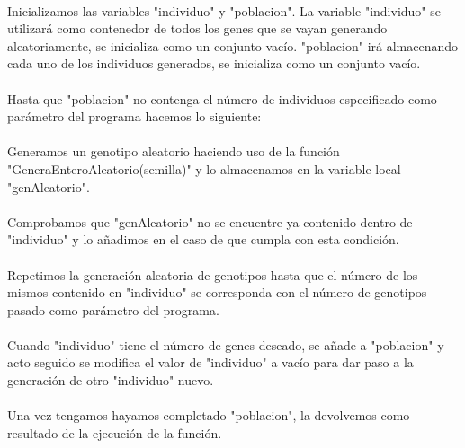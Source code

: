 	\paragraph{}Inicializamos las variables "individuo" y "poblacion". La variable "individuo" se utilizará como contenedor de todos los genes que se vayan generando aleatoriamente, se inicializa como un conjunto vacío. "poblacion" irá almacenando cada uno de los individuos generados, se inicializa como un conjunto vacío.
	
	\paragraph{}Hasta que "poblacion" no contenga el número de individuos especificado como parámetro del programa hacemos lo siguiente:
	
	\paragraph{}Generamos un genotipo aleatorio haciendo uso de la función "GeneraEnteroAleatorio(semilla)" y lo almacenamos en la variable local "genAleatorio".
	
	\paragraph{}Comprobamos que "genAleatorio" no se encuentre ya contenido dentro de "individuo" y lo añadimos en el caso de que cumpla con esta condición.
	
	\paragraph{}Repetimos la generación aleatoria de genotipos hasta que el número de los mismos contenido en "individuo" se corresponda con el número de genotipos pasado como parámetro del programa.
	
	\paragraph{}Cuando "individuo" tiene el número de genes deseado, se añade a "poblacion" y acto seguido se modifica el valor de "individuo" a vacío para dar paso a la generación de otro "individuo" nuevo.
	
	\paragraph{}Una vez tengamos hayamos completado "poblacion", la devolvemos como resultado de la ejecución de la función.

